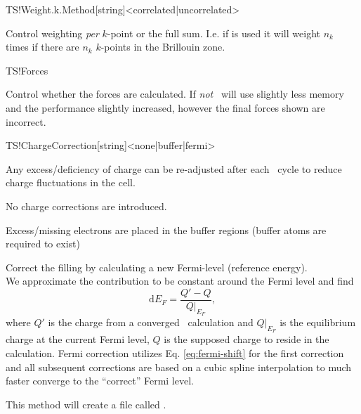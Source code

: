 \begin{fdfentry}{TS!Weight.k.Method}[string]<correlated|uncorrelated>

  Control weighting \emph{per} $k$-point or the full sum. I.e. if
   is used it will weight $n_k$ times if there are
  $n_k$ $k$-points in the Brillouin zone.
  
\end{fdfentry}

\begin{fdflogicalT}{TS!Forces}
  
  Control whether the forces are calculated. If \emph{not} \tsiesta\
  will use slightly less memory and the performance slightly
  increased, however the final forces shown are incorrect.

\end{fdflogicalT}

\begin{fdfentry}{TS!ChargeCorrection}[string]<none|buffer|fermi>

  Any excess/deficiency of charge can be re-adjusted after each
  \tsiesta\ cycle to reduce charge fluctuations in the cell.
  
  \begin{fdfoptions}

    \option[none]%
    No charge corrections are introduced.

    \option[buffer]%
    Excess/missing electrons are placed in the buffer regions (buffer
    atoms are required to exist)

    \option[fermi] %
    Correct the filling by calculating a new Fermi-level (reference energy). \\
    We approximate the contribution to be constant around the Fermi
    level and find
    \begin{equation}
      \label{eq:fermi-shift}
      \mathrm{d}E_F = \frac{Q'-Q}{Q|_{E_F}},
    \end{equation}
    where $Q'$ is the charge from a converged \tsiesta\ calculation
    and $Q|_{E_F}$ is the equilibrium charge at the current Fermi
    level, $Q$ is the supposed charge to reside in the
    calculation. Fermi correction utilizes Eq. \eqref{eq:fermi-shift} for
    the first correction and all subsequent corrections are based on a
    cubic spline interpolation to much faster converge to the
    ``correct'' Fermi level.
    
    This method will create a file called .
    
  \end{fdfoptions}

\end{fdfentry}


